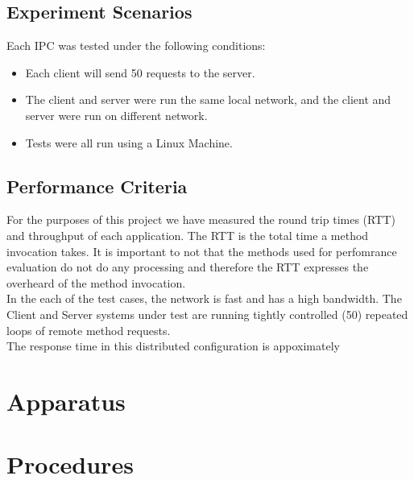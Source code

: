 \documentclass{article}
\begin{document}
\subsection{Experiment Scenarios}
Each IPC was tested under the following conditions:
\begin{itemize}
	\item Each client will send 50 requests to the server.
	\item The client and server were run the same local network, and the client and server were run
	on different network.
	\item Tests were all run using a Linux Machine. 
\end{itemize}

\subsection{Performance Criteria}
For the purposes of this project we have measured the round trip times (RTT) and throughput of each application. The RTT is the total time a method invocation takes. It is important to not that the methods used for perfomrance evaluation do not do any processing and therefore the RTT expresses the overheard of the method invocation. \\

In the each of the test cases, the network is fast and has a high bandwidth. The Client and Server systems under test are running tightly controlled (50) repeated loops of remote method requests. \\

The response time in this distributed configuration is appoximately



 

\section{Apparatus}




\section{Procedures}
\end{document}
